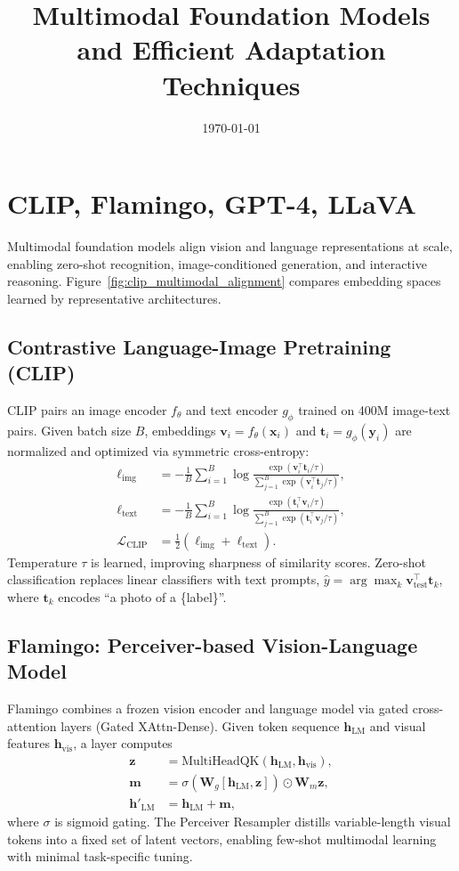\documentclass{article}
\title{Multimodal Foundation Models and Efficient Adaptation Techniques}
\author{}
\date{\today}
\begin{document}
\maketitle
\tableofcontents
\FloatBarrier

\section{CLIP, Flamingo, GPT-4, LLaVA}
Multimodal foundation models align vision and language representations at scale, enabling zero-shot recognition, image-conditioned generation, and interactive reasoning. Figure~\ref{fig:clip_multimodal_alignment} compares embedding spaces learned by representative architectures.

\subsection{Contrastive Language-Image Pretraining (CLIP)}
CLIP pairs an image encoder $f_{\theta}$ and text encoder $g_{\phi}$ trained on 400M image-text pairs. Given batch size $B$, embeddings $\mathbf{v}_i = f_{\theta}(\mathbf{x}_i)$ and $\mathbf{t}_i = g_{\phi}(\mathbf{y}_i)$ are normalized and optimized via symmetric cross-entropy:
\begin{align}
  \ell_{\text{img}} &= -\frac{1}{B} \sum_{i=1}^{B} \log \frac{\exp(\mathbf{v}_i^\top \mathbf{t}_i / \tau)}{\sum_{j=1}^{B} \exp(\mathbf{v}_i^\top \mathbf{t}_j / \tau)}, \\
  \ell_{\text{text}} &= -\frac{1}{B} \sum_{i=1}^{B} \log \frac{\exp(\mathbf{t}_i^\top \mathbf{v}_i / \tau)}{\sum_{j=1}^{B} \exp(\mathbf{t}_i^\top \mathbf{v}_j / \tau)}, \\
  \mathcal{L}_{\text{CLIP}} &= \frac{1}{2} (\ell_{\text{img}} + \ell_{\text{text}}).
\end{align}
Temperature $\tau$ is learned, improving sharpness of similarity scores. Zero-shot classification replaces linear classifiers with text prompts, $\hat{y} = \arg\max_{k} \mathbf{v}_\mathrm{test}^\top \mathbf{t}_k$, where $\mathbf{t}_k$ encodes ``a photo of a \{label\}''.

\subsection{Flamingo: Perceiver-based Vision-Language Model}
Flamingo combines a frozen vision encoder and language model via gated cross-attention layers (Gated XAttn-Dense). Given token sequence $\mathbf{h}_{\mathrm{LM}}$ and visual features $\mathbf{h}_{\mathrm{vis}}$, a layer computes
\begin{align}
  \mathbf{z} &= \mathrm{MultiHeadQK}(\mathbf{h}_{\mathrm{LM}}, \mathbf{h}_{\mathrm{vis}}), \\
  \mathbf{m} &= \sigma(\mathbf{W}_g [\mathbf{h}_{\mathrm{LM}}, \mathbf{z}]) \odot \mathbf{W}_m \mathbf{z}, \\
  \mathbf{h}'_{\mathrm{LM}} &= \mathbf{h}_{\mathrm{LM}} + \mathbf{m},
\end{align}
where $\sigma$ is sigmoid gating. The Perceiver Resampler distills variable-length visual tokens into a fixed set of latent vectors, enabling few-shot multimodal learning with minimal task-specific tuning.
\end{document}

